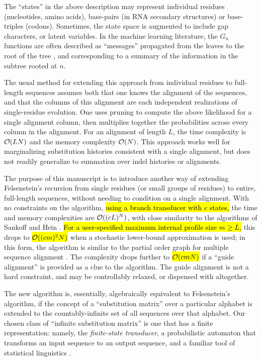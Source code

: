 \documentclass{article}
\begin{document}
The ``states'' in the above description may represent individual residues (nucleotides, amino acids), base-pairs (in RNA secondary structures) or base-triples (codons).
Sometimes, the state space is augmented to include gap characters, or latent variables.
In the machine learning literature, the $G_n$ functions are often described as ``messages'' propagated from the leaves to the root of the tree \cite{KschischangEtAl98},
and corresponding to a summary of the information in the subtree rooted at $n$.

The usual method for extending this approach from individual residues to full-length sequences assumes both that one knows the alignment of the sequences, 
and that the columns of this alignment are each independent realizations of single-residue evolution.  
One uses pruning to compute the above likelihood for a single alignment column,
then multiplies together the probabilities across every column in the alignment.
For an alignment of length $L$, the time complexity is ${\cal O}(LN)$ and the memory complexity ${\cal O}(N)$.
This approach works well for marginalizing substitution histories consistent with a single alignment,
but does not readily generalize to summation over indel histories or alignments.

The purpose of this manuscript is to introduce another way of extending Felsenstein's recursion from single residues (or small groups of residues)
to entire, full-length sequences, without needing to condition on a single alignment.
With no constraints on the algorithm, \hl{using a branch transducer with $c$ states,}
the time and memory complexities are ${\cal O}((cL)^N)$,
with close similarity to the algorithms of Sankoff \cite{SankoffCedergren83} and Hein \cite{Hein2001}.
\hl{For a user-specified maximum internal profile size  $m \geq L$, }
this drops to \hl{ ${\cal O}((cm)^2 N)$} when
 a stochastic lower-bound approximation is used; 
in this form,
the algorithm is similar to the partial order graph for multiple sequence alignment \cite{LeeGrassoSharlow2002}.
The complexity drops further to \hl{${\cal O}(cmN)$} if a ``guide alignment'' is provided as a clue to the algorithm.
The guide alignment is not a hard constraint,
and may be controllably relaxed, or dispensed with altogether.

The new algorithm is, essentially, algebraically equivalent to Felsenstein's algorithm,
if the concept of a ``substitution matrix'' over a particular alphabet is extended to the countably-infinite set of all sequences over that alphabet.
Our chosen class of ``infinite substitution matrix'' is one that has a finite representation:
namely, the {\em finite-state transducer}, a probabilistic automaton that transforms an input sequence to an output sequence,
and a familiar tool of statistical linguistics \cite{MohriPereiraRiley2000}.
\end{document}
